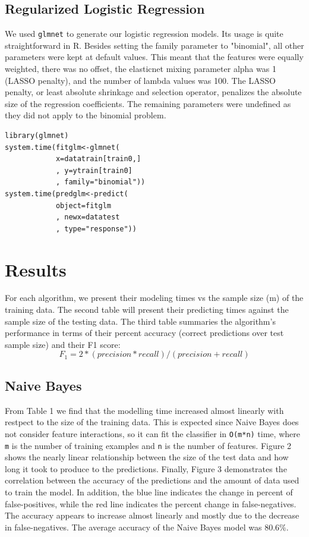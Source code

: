 \documentclass[twoside]{article}
\begin{document}
\begin{multicols}{2}
\subsection{Regularized Logistic Regression}
We used \texttt{glmnet} to generate our logistic regression models. Its usage is quite straightforward in R. Besides setting the family parameter to "binomial", all other parameters were kept at default values. This meant that the features were equally weighted, there was no offset, the elasticnet mixing parameter alpha was 1 (LASSO penalty), and the number of lambda values was 100\cite{4}. The LASSO penalty, or least absolute shrinkage and selection operator, penalizes the absolute size of the regression coefficients. The remaining parameters were undefined as they did not apply to the binomial problem.
\begin{verbatim}
library(glmnet)
system.time(fitglm<-glmnet(
            x=datatrain[train0,]
            , y=ytrain[train0]
            , family="binomial"))
system.time(predglm<-predict(
            object=fitglm
            , newx=datatest
            , type="response"))
\end{verbatim}


\section{Results}

For each algorithm, we present their modeling times vs the sample size (m) of the training data. The second table will present their predicting times against the sample size of the testing data. The third table summaries the algorithm's performance in terms of their percent accuracy (correct predictions over test sample size) and their F1 score:
\[ F_1 = 2*(precision * recall)/(precision + recall) \]

\subsection{Naive Bayes}

From Table 1 we find that the modelling time increased almost linearly with restpect to the size of the training data. This is expected since Naive Bayes does not consider feature interactions, so it can fit the classifier in \texttt{O(m*n)} time, where \texttt{m} is the number of training examples and \texttt{n} is the number of features. Figure 2 shows the nearly linear relationship between the size of the test data and how long it took to produce to the predictions. Finally, Figure 3 demonstrates the correlation between the accuracy of the predictions and the amount of data used to train the model. In addition, the blue line indicates the change in percent of false-positives, while the red line indicates the percent change in false-negatives. The accuracy appears to increase almost linearly and mostly due to the decrease in false-negatives. The average accuracy of the Naive Bayes model was 80.6\%.


\end{multicols}
\end{document}
